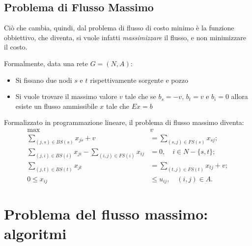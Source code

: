 \subsection{Problema di Flusso Massimo}

Ciò che cambia, quindi, dal problema di flusso di costo minimo è la funzione obbiettivo, che diventa, si vuole infatti \textit{massimizzare} il flusso, e non minimizzare il costo. 

Formalmente, data una rete $G = (N,A)$:
\begin{itemize}
  \item Si fissano due nodi $s$ e $t$ rispettivamente sorgente e pozzo
  \item  Si vuole trovare il massimo valore $v$ tale che se $b_s=-v, \, b_t=v$ e $b_i=0$ allora esiste un flusso ammissibile $x$ tale che $Ex=b$
\end{itemize}

Formalizzato in programmazione lineare, il problema di flusso massimo diventa:
\begin{equation}
  \begin{aligned}
  \max \quad & v \\
  \sum_{(j,s) \in BS(s)} x_{js} + v &= \sum_{(s,j) \in FS(s)} x_{sj}; \\
  \sum_{(j,i) \in BS(i)} x_{ji} - \sum_{(i,j) \in FS(i)} x_{ij} &= 0, \quad i \in N - \{s, t\}; \\
  \sum_{(j,t) \in BS(t)} x_{jt} &= \sum_{(t,j) \in FS(t)} x_{tj} + v; \\
  0 \leq x_{ij} &\leq u_{ij}, \quad (i,j) \in A.
  \end{aligned}
\end{equation}

  
\section{Problema del flusso massimo: algoritmi}

